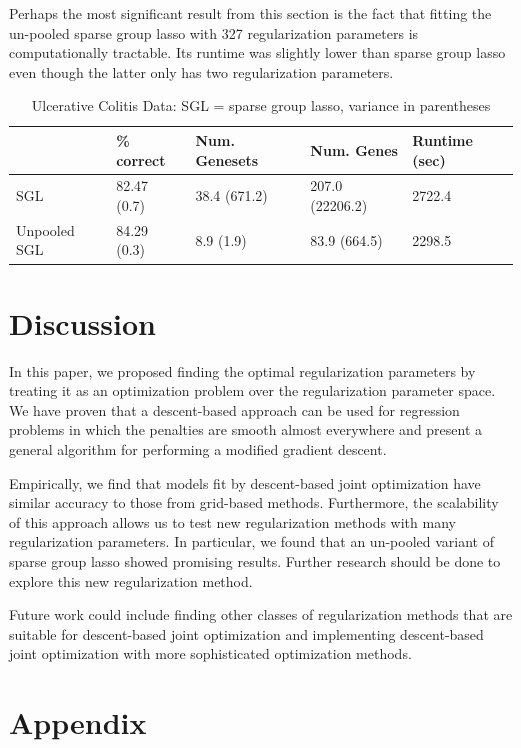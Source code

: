 \documentclass[10pt,letterpaper]{article}
\begin{document}
Perhaps the most significant result from this section is the fact that fitting the un-pooled sparse group lasso with 327 regularization parameters is computationally tractable. Its runtime was slightly lower than sparse group lasso even though the latter only has two regularization parameters.

\begin{table}
\begin{center}
\begin{tabular}{| l | l | l | l | l | }
\hline
 & \% correct  & Num. Genesets & Num. Genes & Runtime (sec) \\
\hline
SGL & 82.47 (0.7) & 38.4 (671.2) & 207.0 (22206.2) & 2722.4 \\
\hline
Unpooled SGL & 84.29 (0.3) & 8.9 (1.9) & 83.9 (664.5) & 2298.5 \\
\hline
\end{tabular}
\end{center}
\caption {Ulcerative Colitis Data: SGL = sparse group lasso, variance in parentheses}
\label{colitis}
\end{table}

\section{Discussion}
In this paper, we proposed finding the optimal regularization parameters by treating it as an optimization problem over the regularization parameter space. We have proven that a descent-based approach can be used for regression problems in which the penalties are smooth almost everywhere and present a general algorithm for performing a modified gradient descent.

Empirically, we find that models fit by descent-based joint optimization have similar accuracy to those from grid-based methods. Furthermore, the scalability of this approach allows us to test new regularization methods with many regularization parameters. In particular, we found that an un-pooled variant of sparse group lasso showed promising results. Further research should be done to explore this new regularization method.

Future work could include finding other classes of regularization methods that are suitable for descent-based joint optimization and implementing descent-based joint optimization with more sophisticated optimization methods.

\section{Appendix}
\end{document}
